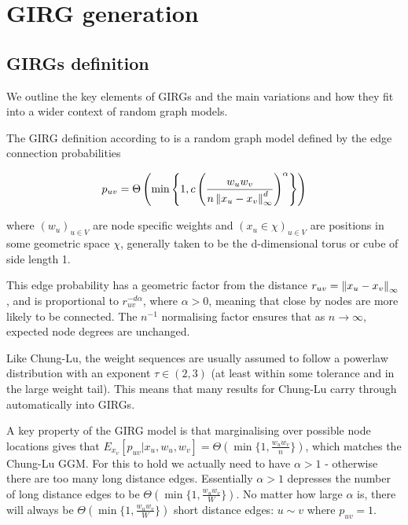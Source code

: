 \chapter{GIRG generation}
\section{GIRGs definition}
We outline the key elements of GIRGs and the main variations and how they fit into a wider context of random graph models.

The GIRG definition according to \cite{bringmann2019geometric} is a random graph model defined by the edge connection probabilities

\begin{equation}
    p_{uv} = \Theta \left ( \min \left \{ 
        1,
        c \left (
            \frac{w_u w_v}{ n \left\lVert x_u - x_v\right\rVert_\infty^d}
        \right )^\alpha    
    \right \}
    \right )
\end{equation}


where $(w_u)_{u \in V}$ are node specific weights and $(x_u \in \chi)_{u \in V}$ are positions in some geometric space $\chi$, generally taken to be the d-dimensional torus or cube of side length 1.

This edge probability has a geometric factor from the distance $r_{uv} = \left\lVert x_u - x_v\right\rVert_\infty$, and is proportional to $r_{uv}^{-d \alpha}$, where $\alpha > 0$, meaning that close by nodes are more likely to be connected. The $n^{-1}$ normalising factor ensures that as $n \to \infty$, expected node degrees are unchanged.

Like Chung-Lu, the weight sequences are usually assumed to follow a powerlaw distribution with an exponent $\tau \in (2, 3)$ (at least within some tolerance and in the large weight tail). This means that many results for Chung-Lu carry through automatically into GIRGs.

A key property of the GIRG model is that marginalising over possible node locations gives that $E_{x_v}[p_{uv} | x_u, w_u, w_v] = \Theta(\min\{1, \frac{w_u w_v}{n} \})$, which matches the Chung-Lu GGM. For this to hold we actually need to have $\alpha > 1$ - otherwise there are too many long distance edges. Essentially $\alpha > 1$ depresses the number of long distance edges to be $\Theta(\min\{1, \frac{w_u w_v}{W} \})$. No matter how large $\alpha$ is, there will always be $\Theta(\min\{1, \frac{w_u w_v}{W} \})$ short distance edges: $u \sim v$ where $p_{uv} = 1$.


